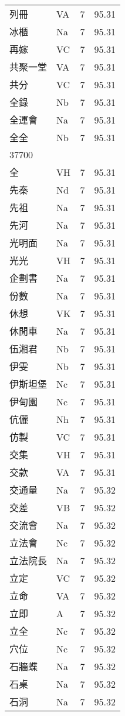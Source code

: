 \documentclass[twocolumn]{book}
\begin{document}
\begin{supertabular}{llrr}
列冊 & VA & 7 &  95.31\\
冰櫃 & Na & 7 &  95.31\\
再嫁 & VC & 7 &  95.31\\
共聚一堂 & VA & 7 &  95.31\\
共分 & VC & 7 &  95.31\\
全錄 & Nb & 7 &  95.31\\
全運會 & Na & 7 &  95.31\\
全全 & Nb & 7 &  95.31\\
37700\\
全 & VH & 7 &  95.31\\
先秦 & Nd & 7 &  95.31\\
先祖 & Na & 7 &  95.31\\
先河 & Na & 7 &  95.31\\
光明面 & Na & 7 &  95.31\\
光光 & VH & 7 &  95.31\\
企劃書 & Na & 7 &  95.31\\
份數 & Na & 7 &  95.31\\
休想 & VK & 7 &  95.31\\
休閒車 & Na & 7 &  95.31\\
伍湘君 & Nb & 7 &  95.31\\
伊雯 & Nb & 7 &  95.31\\
伊斯坦堡 & Nc & 7 &  95.31\\
伊甸園 & Nc & 7 &  95.31\\
伉儷 & Nh & 7 &  95.31\\
仿製 & VC & 7 &  95.31\\
交集 & VH & 7 &  95.31\\
交款 & VA & 7 &  95.31\\
交通量 & Na & 7 &  95.32\\
交差 & VB & 7 &  95.32\\
交流會 & Na & 7 &  95.32\\
立法會 & Nc & 7 &  95.32\\
立法院長 & Na & 7 &  95.32\\
立定 & VC & 7 &  95.32\\
立命 & VA & 7 &  95.32\\
立即 & A & 7 &  95.32\\
立全 & Nc & 7 &  95.32\\
穴位 & Nc & 7 &  95.32\\
石牆蝶 & Na & 7 &  95.32\\
石桌 & Na & 7 &  95.32\\
石洞 & Na & 7 &  95.32\\

\end{supertabular}
\end{document}

